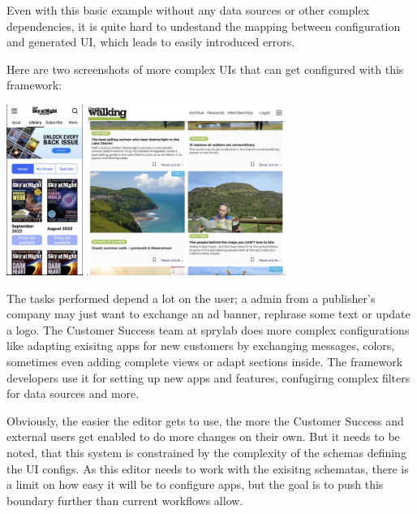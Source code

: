 Even with this basic example without any data sources or other complex dependencies, it is quite hard to undestand the mapping between configuration and generated UI, which leads to easily introduced errors.

Here are two screenshots of more complex UIs that can get configured with this framework:

\includegraphics[height=15em]{pics/experience_screenshot_01.jpg}
\includegraphics[height=15em]{pics/expeirence_screenshot_02.jpg}

The tasks performed depend a lot on the user; a admin from a publisher's company may just want to exchange an ad banner, rephrase some text or update a logo.
The Customer Success team at sprylab does more complex configurations like adapting exisitng apps for new customers by exchanging messages, colors, sometimes even adding complete views or adapt sections inside.
The framework developers use it for setting up new apps and features, confugirng complex filters for data sources and more.

Obviously, the easier the editor gets to use, the more the Customer Success and external users get enabled to do more changes on their own.
But it needs to be noted, that this system is constrained by the complexity of the schemas defining the UI configs. As this editor needs to work with the exisitng schematas, there is a limit on how easy it will be to configure apps, but the goal is to push this boundary further than current workflows allow.

